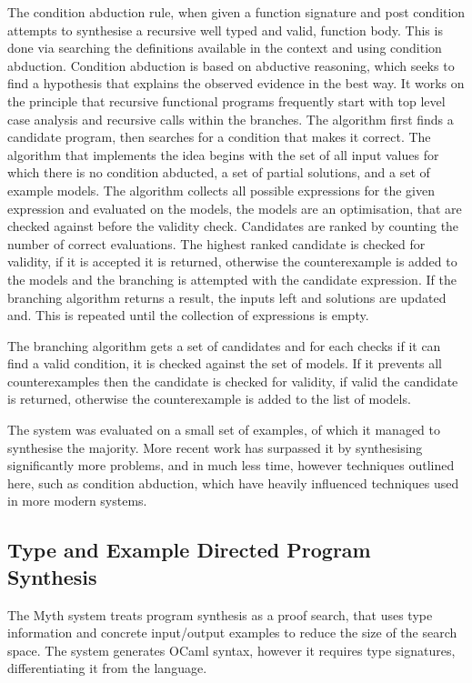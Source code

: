 \documentclass[a4paper]{article}
\begin{document}
The condition abduction rule, when given a function signature and post condition attempts to synthesise a recursive 
well typed and valid, function body. This is done via searching the definitions available in the context and using 
condition abduction. Condition abduction is based on abductive reasoning, which seeks to find a hypothesis that explains the 
observed evidence in the best way. It works on the principle that recursive functional programs frequently start with top 
level case analysis and recursive calls within the branches. The algorithm first finds a candidate program, then searches
for a condition that makes it correct. The algorithm that implements the idea begins with the set of all input values 
for which there is no condition abducted, a set of partial solutions, and a set of example models. The algorithm collects 
all possible expressions for the given expression and evaluated on the models, the models are an optimisation, that are 
checked against before the validity check. Candidates are ranked by counting the number of correct evaluations. The highest ranked candidate is checked 
for validity, if it is accepted it is returned, otherwise the counterexample is added to the models and the branching is 
attempted with the candidate expression. If the branching algorithm returns a result, the inputs left and solutions are
updated and. This is repeated until the collection of expressions is empty. 

The branching algorithm gets a set of candidates and for each checks if it can find a valid condition, it is checked 
against the set of models. If it prevents all counterexamples then the candidate is checked for validity, if valid the 
candidate is returned, otherwise the counterexample is added to the list of models. 

The system was evaluated on a small set of examples, of which it managed to synthesise the majority. More recent work 
has surpassed it by synthesising significantly more problems, and in much less time, however techniques outlined here, 
such as condition abduction, which have heavily influenced techniques used in more modern systems.

\subsection{Type and Example Directed Program Synthesis}
\label{sec:org01eb88d}
The Myth system treats program synthesis as a proof search, that uses
type information and concrete input/output examples to reduce the size
of the search space. The system generates OCaml syntax, however it 
requires type signatures, differentiating it from the language.
\end{document}
